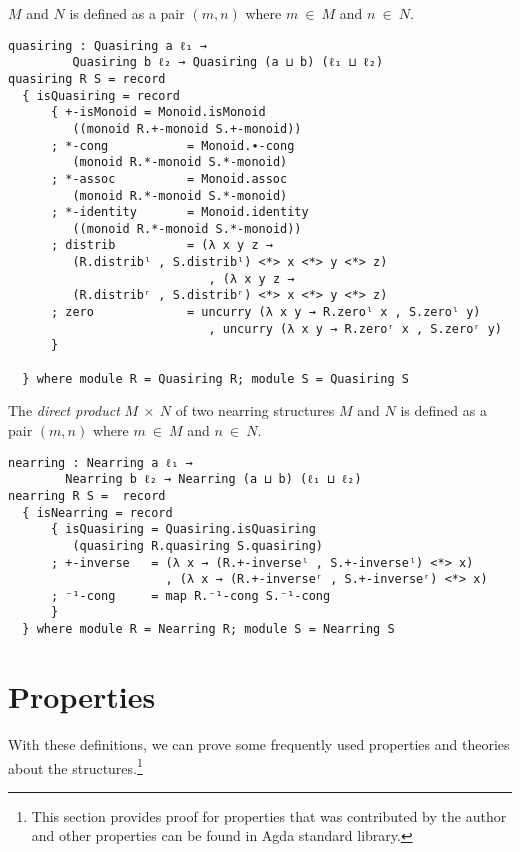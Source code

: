 $M$ and $N$ is defined as a pair $(m,n)$ where $m \ \in \ M$ and $n \ \in \ N$.
\begin{verbatim}
quasiring : Quasiring a ℓ₁ →
		 Quasiring b ℓ₂ → Quasiring (a ⊔ b) (ℓ₁ ⊔ ℓ₂)
quasiring R S = record
  { isQuasiring = record
      { +-isMonoid = Monoid.isMonoid
		 ((monoid R.+-monoid S.+-monoid))
      ; *-cong           = Monoid.∙-cong
		 (monoid R.*-monoid S.*-monoid)
      ; *-assoc          = Monoid.assoc
		 (monoid R.*-monoid S.*-monoid)
      ; *-identity       = Monoid.identity
		 ((monoid R.*-monoid S.*-monoid))
      ; distrib          = (λ x y z →
		 (R.distribˡ , S.distribˡ) <*> x <*> y <*> z)
                            , (λ x y z →
		 (R.distribʳ , S.distribʳ) <*> x <*> y <*> z)
      ; zero             = uncurry (λ x y → R.zeroˡ x , S.zeroˡ y)
                            , uncurry (λ x y → R.zeroʳ x , S.zeroʳ y)
      }

  } where module R = Quasiring R; module S = Quasiring S
\end{verbatim}
The \textit{direct product} $M \ \times \ N$ of two nearring structures
$M$ and $N$ is defined as a pair $(m,n)$ where $m \ \in \ M$ and $n \ \in \ N$.
\begin{verbatim}
nearring : Nearring a ℓ₁ → 
		Nearring b ℓ₂ → Nearring (a ⊔ b) (ℓ₁ ⊔ ℓ₂)
nearring R S =  record
  { isNearring = record
      { isQuasiring = Quasiring.isQuasiring
		 (quasiring R.quasiring S.quasiring)
      ; +-inverse   = (λ x → (R.+-inverseˡ , S.+-inverseˡ) <*> x)
                      , (λ x → (R.+-inverseʳ , S.+-inverseʳ) <*> x)
      ; ⁻¹-cong     = map R.⁻¹-cong S.⁻¹-cong
      }
  } where module R = Nearring R; module S = Nearring S
\end{verbatim}
\section{Properties}
With these definitions, we can prove some frequently used properties and theories
about the structures.\footnote{This section provides proof for properties that
was contributed by the author and other properties can be found in Agda standard
library.}

